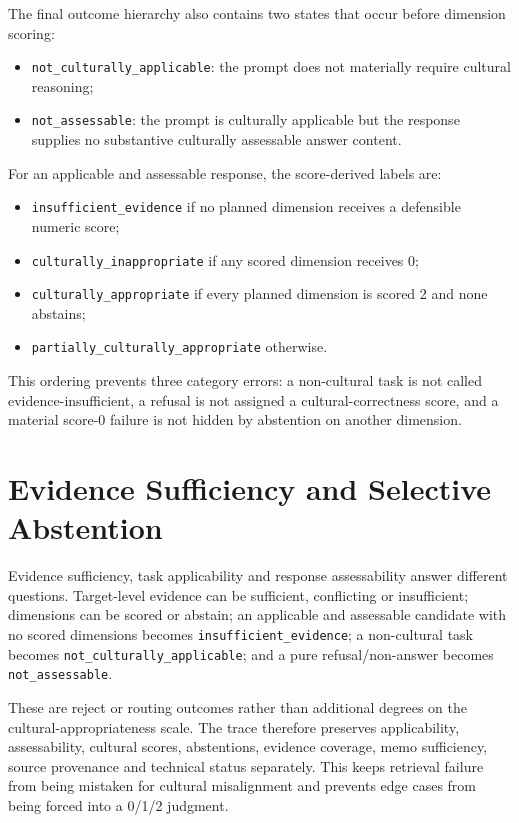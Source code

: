The final outcome hierarchy also contains two states that occur before dimension scoring:
\begin{itemize}
    \item \texttt{not\_culturally\_applicable}: the prompt does not materially require cultural reasoning;
    \item \texttt{not\_assessable}: the prompt is culturally applicable but the response supplies no substantive culturally assessable answer content.
\end{itemize}

For an applicable and assessable response, the score-derived labels are:
\begin{itemize}
    \item \texttt{insufficient\_evidence} if no planned dimension receives a defensible numeric score;
    \item \texttt{culturally\_inappropriate} if any scored dimension receives 0;
    \item \texttt{culturally\_appropriate} if every planned dimension is scored 2 and none abstains;
    \item \texttt{partially\_culturally\_appropriate} otherwise.
\end{itemize}

This ordering prevents three category errors: a non-cultural task is not called evidence-insufficient, a refusal is not assigned a cultural-correctness score, and a material score-0 failure is not hidden by abstention on another dimension.

\section{Evidence Sufficiency and Selective Abstention}

Evidence sufficiency, task applicability and response assessability answer different questions. Target-level evidence can be sufficient, conflicting or insufficient; dimensions can be scored or abstain; an applicable and assessable candidate with no scored dimensions becomes \texttt{insufficient\_evidence}; a non-cultural task becomes \texttt{not\_culturally\_applicable}; and a pure refusal/non-answer becomes \texttt{not\_assessable}.

These are reject or routing outcomes rather than additional degrees on the cultural-appropriateness scale. The trace therefore preserves applicability, assessability, cultural scores, abstentions, evidence coverage, memo sufficiency, source provenance and technical status separately. This keeps retrieval failure from being mistaken for cultural misalignment and prevents edge cases from being forced into a 0/1/2 judgment.

